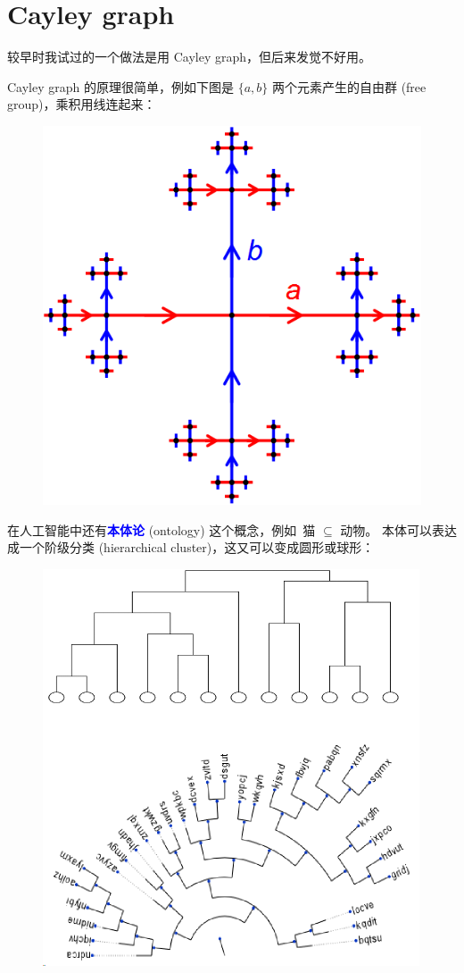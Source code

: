 \documentclass[12pt]{article}
\newcommand{\concept}[1]{\textbf{\textcolor{blue}{#1}}}
\newcommand{\formula}[1]{\textcolor{LogicColor}{#1}}
\begin{document}
\section{Cayley graph}

较早时我试过的一个做法是用 Cayley graph，但后来发觉不好用。

Cayley graph 的原理很简单，例如下图是 $\{ a, b \}$ 两个元素产生的自由群 (free group)，乘积用线连起来：
\begin{figure}[H]
\centering
\includegraphics[scale=0.25]{cayley-graph.jpg}
\end{figure}

在人工智能中还有\concept{本体论} (ontology) 这个概念，例如\, \formula{猫 $\subseteq$ 动物}。 本体可以表达成一个阶级分类 (hierarchical cluster)，这又可以变成圆形或球形：
\begin{figure}[H]
\centering
\includegraphics[scale=0.5]{ontology-ball.png}
\end{figure}
\end{document}
